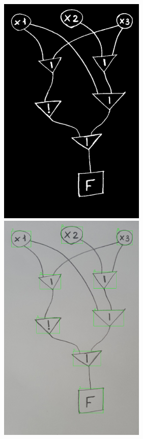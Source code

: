 \documentclass[makeidx, a4paper, 14pt]{extarticle}
\begin{document}
\begin{figure}[H]
    \centering
    \includegraphics[width=70mm]{handwritten_1_binarized_image.png}
    \includegraphics[width=70mm]{handwritten_1_detect_labels.png}
\end{figure}
\end{document}
